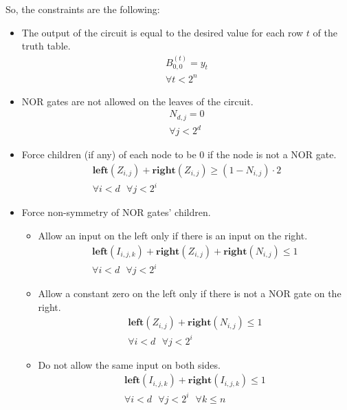 \documentclass[letterpaper,10pt]{article}
\begin{document}
So, the constraints are the following:
\begin{itemize}
    \item The output of the circuit is equal to the desired value for each row $t$ of the truth table.
    \begin{align*}
        B_{0,0}^{(t)} = y_t \\
        \forall t < 2^n
    \end{align*}
    \item NOR gates are not allowed on the leaves of the circuit.
    \begin{align*}
        N_{d,j} = 0 \\
        \forall j < 2^d 
    \end{align*}
    \item Force children (if any) of each node to be 0 if the node is not a NOR gate.
    \begin{align*}
        \mathbf{left}(Z_{i,j}) + \mathbf{right}(Z_{i,j}) \geq (1-N_{i,j})\cdot 2 \\
        \forall i < d\text{ }\forall j < 2^i
    \end{align*}
    \item Force non-symmetry of NOR gates' children.
    \begin{itemize}
        \item Allow an input on the left only if there is an input on the right.
            \begin{align*}
                \mathbf{left}(I_{i,j,k}) + \mathbf{right}(Z_{i,j}) + \mathbf{right}(N_{i,j}) \leq 1 \\
                \forall i < d\text{ }\forall j < 2^i
            \end{align*}
        \item Allow a constant zero on the left only if there is not a NOR gate on the right.
            \begin{align*}
                \mathbf{left}(Z_{i,j}) + \mathbf{right}(N_{i,j}) \leq 1  \\
                \forall i < d\text{ }\forall j < 2^i
            \end{align*}
        \item Do not allow the same input on both sides.
            \begin{align*}
                \mathbf{left}(I_{i,j,k}) + \mathbf{right}(I_{i,j,k}) \leq 1 \\
                \forall i < d\text{ }\forall j < 2^i\text{ }\forall k \leq n
            \end{align*}

\end{itemize}
\end{itemize}
\end{document}

